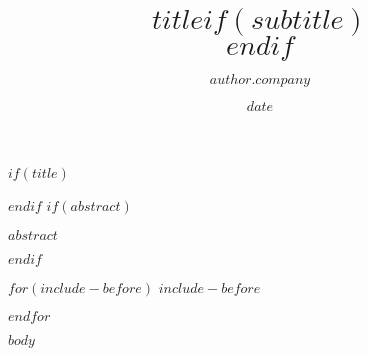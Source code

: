 \documentclass[	DIV=calc,%
							paper=a4,%
							fontsize=10pt]{scrartcl}	 					%
\title{$title$$if(subtitle)$\\\vspace{0.5em}{\large $subtitle$}$endif$}
\author{$author.company$}
\date{$date$}
\renewenvironment{abstract}
  {\begin{tcolorbox}[colframe=myblue,colback=mygraylight]}
  {\end{tcolorbox}}
\begin{document}
$if(title)$
\maketitle
$endif$
$if(abstract)$
\begin{abstract}
$abstract$
\end{abstract}
$endif$

$for(include-before)$
$include-before$

$endfor$

\thispagestyle{fancy} 			%

$body$
\end{document}
